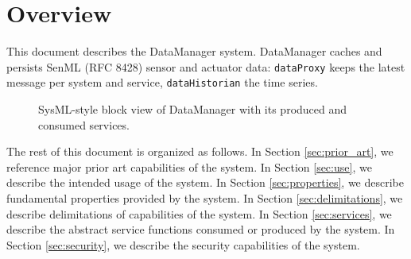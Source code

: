 \documentclass[a4paper]{arrowhead}
\begin{document}
\section{Overview}
\label{sec:overview}

This document describes the DataManager system. DataManager caches and persists SenML (RFC 8428) sensor and actuator data: \texttt{dataProxy} keeps the latest message per system and service, \texttt{dataHistorian} the time series.

\begin{figure}[ht!]
  \centering
  \caption{SysML-style block view of DataManager with its produced and consumed services.}
  \label{fig:system}
\end{figure}

The rest of this document is organized as follows.
In Section \ref{sec:prior_art}, we reference major prior art capabilities of the system.
In Section \ref{sec:use}, we describe the intended usage of the system.
In Section \ref{sec:properties}, we describe fundamental properties provided by the system.
In Section \ref{sec:delimitations}, we describe delimitations of capabilities of the system.
In Section \ref{sec:services}, we describe the abstract service functions consumed or produced by the system.
In Section \ref{sec:security}, we describe the security capabilities of the system.
\end{document}
